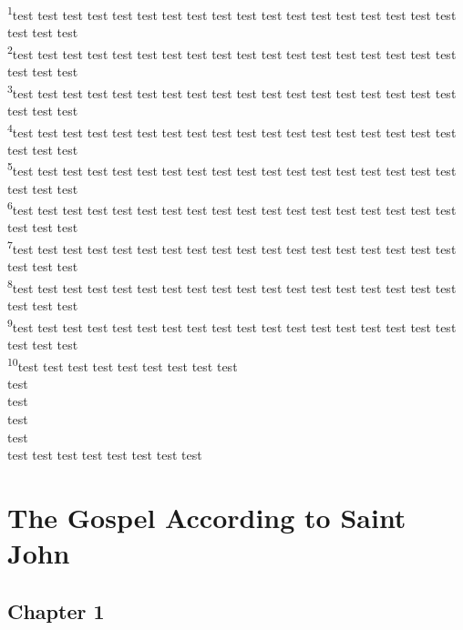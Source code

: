 \documentclass[10pt,twocolumn]{memoir}
\newcommand{\verseref}[2]{\textsuperscript{#2}}
\begin{document}
\noindent
\verseref{3}{1}test test test test test test test test test test test test test test test test test test test test test\\ 
\verseref{3}{2}test test test test test test test test test test test test test test test test test test test test test\\ 
\verseref{3}{3}test test test test test test test test test test test test test test test test test test test test test\\ 
\verseref{3}{4}test test test test test test test test test test test test test test test test test test test test test\\ 
\verseref{3}{5}test test test test test test test test test test test test test test test test test test test test test\\ 
\verseref{3}{6}test test test test test test test test test test test test test test test test test test test test test\\ 
\verseref{3}{7}test test test test test test test test test test test test test test test test test test test test test\\ 
\verseref{3}{8}test test test test test test test test test test test test test test test test test test test test test\\ 
\verseref{3}{9}test test test test test test test test test test test test test test test test test test test test test\\ 
\verseref{3}{10}test test test test test test test test test\\ test\\ test\\ test\\ test\\ test test test test test test test test\\



\chapter*{The Gospel According to Saint John}

\section*{Chapter 1}
\end{document}
